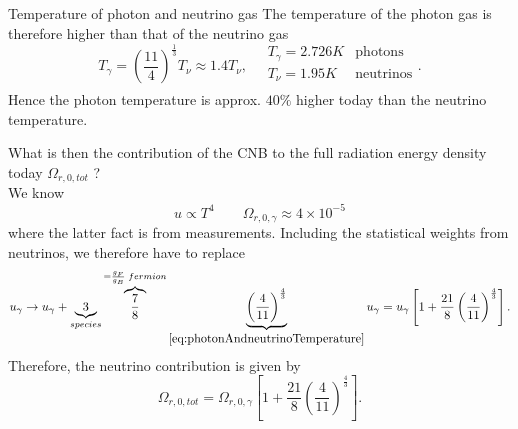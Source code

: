 \begin{mybox}{Temperature of photon and neutrino gas}
The temperature of the photon gas is therefore higher than that of the neutrino gas
\begin{equation}
\label{eq:photonAndneutrinoTemperature}
	T_\gamma = \left(\frac{11}{4}\right)^{\frac{1}{3}} T_\nu \approx 1.4 T_\nu,\quad \begin{array}{ll}
	T_\gamma = 2.726 K & \text{photons}\\
	T_\nu =1.95 K & \text{neutrinos} \\
	\end{array}.
\end{equation}
Hence the photon temperature is approx. $40\%$ higher today than the neutrino temperature.
\end{mybox}
\vspace{1cm}
What is then the contribution of the CNB to the full radiation energy density today $\Omega_{r,0,tot}$ ? \\
We know
\begin{equation*}
u \propto T^4\qquad \Omega_{r,0,\gamma}\approx 4\times10^{-5}
\end{equation*}
where the latter fact is from measurements. Including the statistical weights from neutrinos, we therefore have to replace
\begin{equation*}
	u_\gamma \rightarrow u_\gamma + \underbrace{3}_{species} \overbrace{\frac{7}{8}}^{=\frac{g_F}{g_B}\; fermion} \underbrace{\left(\frac{4}{11}\right)^{\frac{4}{3}}}_{\ref{eq:photonAndneutrinoTemperature}}u_\gamma = u_\gamma \left[1+\frac{21}{8} \left(\frac{4}{11}\right)^{\frac{4}{3}}\right].
\end{equation*}
Therefore, the neutrino contribution is given by
\begin{equation}
\Omega_{r,0,tot} = \Omega_{r,0,\gamma}\left[1+\frac{21}{8} \left(\frac{4}{11}\right)^{\frac{4}{3}}\right].
\end{equation}

